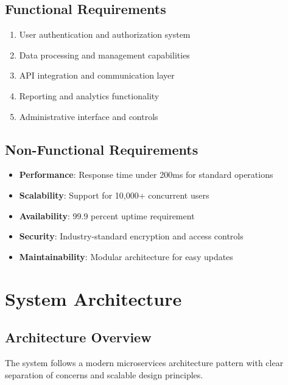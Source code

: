 \documentclass[11pt,a4paper,oneside]{article}
\begin{document}
\subsection{Functional Requirements}

\begin{enumerate}
\item User authentication and authorization system
\item Data processing and management capabilities
\item API integration and communication layer
\item Reporting and analytics functionality
\item Administrative interface and controls
\end{enumerate}

\subsection{Non-Functional Requirements}

\begin{itemize}
\item \textbf{Performance}: Response time under 200ms for standard operations
\item \textbf{Scalability}: Support for 10,000+ concurrent users
\item \textbf{Availability}: 99.9 percent uptime requirement
\item \textbf{Security}: Industry-standard encryption and access controls
\item \textbf{Maintainability}: Modular architecture for easy updates
\end{itemize}

\section{System Architecture}

\subsection{Architecture Overview}

The system follows a modern microservices architecture pattern with clear separation of concerns and scalable design principles.
\end{document}

